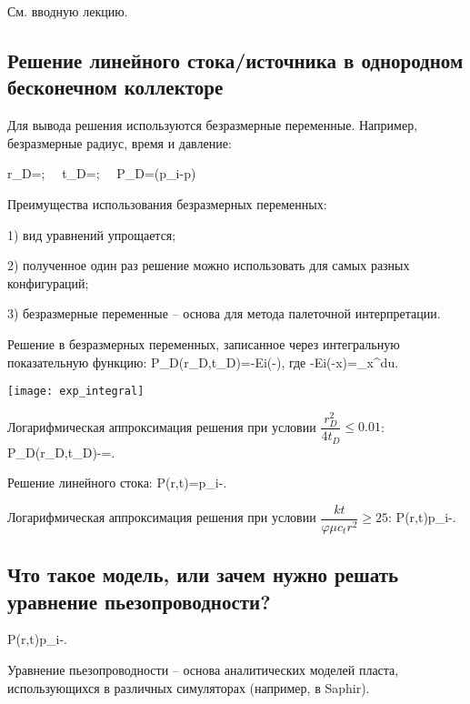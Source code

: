 \documentclass[main.tex]{subfiles}
\begin{document}
См. вводную лекцию.

\subsection{Решение линейного стока/источника в однородном бесконечном коллекторе}

Для вывода решения используются безразмерные переменные. Например, безразмерные радиус, время и давление:

\beq
r_D=;\,\,\,\,\,\,\,\,t_D=;\,\,\,\,\,\,\,\,P_D=\left(p_i-p\right)
\eeq

Преимущества использования безразмерных переменных:

1) вид уравнений упрощается;

2) полученное один раз решение можно использовать для самых разных конфигураций;

3) безразмерные переменные -- основа для метода палеточной интерпретации.

Решение в безразмерных переменных, записанное через интегральную показательную функцию:
\beq
P_D(r_D,t_D)=-Ei\left(-\right),
\eeq
где
\beq
-Ei(-x)=\int\limits_{x}^{\infty}du.
\eeq

\texttt{[image: exp\_integral]}

Логарифмическая аппроксимация решения при условии $\dfrac{r_D^2}{4t_D}\leqslant0.01$:
\beq
P_D(r_D,t_D)\approx -=.
\eeq

Решение линейного стока:
\beq
P(r,t)=p_i-.
\eeq

Логарифмическая аппроксимация решения при условии $\dfrac{kt}{\varphi \mu c_t r^2}\geqslant25$:
\beq
P(r,t)\approx p_i-.
\eeq

\subsection{Что такое модель, или зачем нужно решать уравнение пьезопроводности?}

\beq
P(r,t)\approx p_i-.
\eeq

Уравнение пьезопроводности -- основа аналитических моделей пласта, использующихся в различных симуляторах (например, в Saphir).
\end{document}
